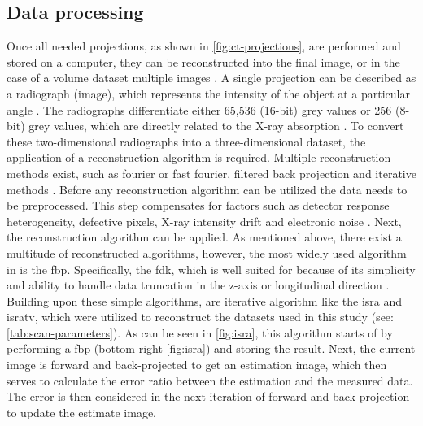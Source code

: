 \subsection{Data processing}
\label{s:b-mct-processing}
Once all needed projections, as shown in \cref{fig:ct-projections}, are performed and stored on a computer, they can be reconstructed into the final image, or in the case of a volume dataset multiple images \cite{liMicrocomputedTomographySmall2008,orhanMicrocomputedTomographyMicroCT2020}.
A single projection can be described as a radiograph (image), which represents the intensity of the object at a particular angle \cite{liMicrocomputedTomographySmall2008,orhanMicrocomputedTomographyMicroCT2020}.
The radiographs differentiate either 65,536 (16-\gls{bit}) grey values or 256 (8-\gls{bit}) grey values, which are directly related to the X-ray absorption \cite{liMicrocomputedTomographySmall2008,orhanMicrocomputedTomographyMicroCT2020}.
To convert these two-dimensional radiographs into a three-dimensional dataset, the application of a reconstruction algorithm is required.
Multiple reconstruction methods exist, such as fourier or fast fourier, filtered back projection and iterative methods \cite{liMicrocomputedTomographySmall2008,orhanMicrocomputedTomographyMicroCT2020}.
Before any reconstruction algorithm can be utilized the data needs to be preprocessed.
This step compensates for factors such as detector response heterogeneity, defective pixels, X-ray intensity drift and electronic noise \cite{liMicrocomputedTomographySmall2008}.
Next, the reconstruction algorithm can be applied.
As mentioned above, there exist a multitude of reconstructed algorithms, however,
the most widely used algorithm in \mct\space is the \acrfull{fbp}.
Specifically, the \acrfull{fdk}, which is well suited for \mct\space because of its simplicity
and ability to handle data truncation in the z-axis or longitudinal direction \cite{liMicrocomputedTomographySmall2008,orhanMicrocomputedTomographyMicroCT2020}.
Building upon these simple algorithms, are iterative algorithm like the \gls{isra} and \gls{isratv},
which were utilized to reconstruct the datasets used in this study (see: \cref{tab:scan-parameters}).
As can be seen in \cref{fig:isra}, this algorithm starts of by performing a \acrshort{fbp} (bottom right \cref{fig:isra}) and storing the result.
Next, the current image is forward and back-projected  to get an estimation image,
which then serves to calculate the error ratio between the estimation and the measured data.
The error is then considered in the next iteration of forward and back-projection to update the estimate image.
